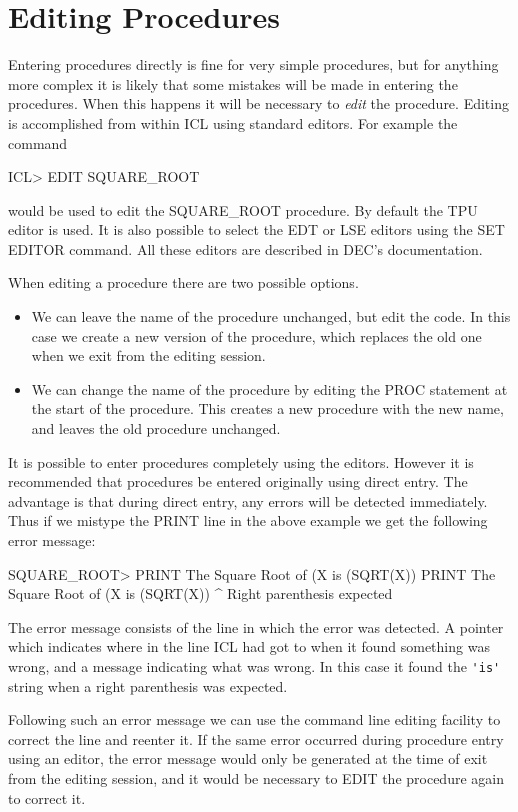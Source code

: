 \documentclass[twoside,11pt,nolof,chapters]{starlink}
\begin{document}
\section{Editing Procedures}
Entering procedures directly is fine for very simple procedures, but for
anything more complex it is likely that some mistakes will be made in
entering the procedures. When this happens it will be necessary to
\emph{edit} the procedure. Editing is accomplished from within ICL using
standard editors.
For example the command
\begin{terminalv}
    ICL> EDIT SQUARE_ROOT
\end{terminalv}
would be used to edit the SQUARE\_ROOT procedure. By default the TPU editor
is used. It is also possible to select the EDT or LSE editors using the
SET EDITOR command. All these editors are described in DEC's documentation.

When editing a procedure there are two possible options.
\begin{itemize}
\item We can leave the name of the procedure unchanged, but edit the code. In
this case we create a new version of the procedure, which replaces the old
one when we exit from the editing session.
\item We can change the name of the procedure by editing the PROC statement
at the start of the procedure. This creates a new procedure with the
new name, and leaves the old procedure unchanged.
\end{itemize}

It is possible to enter procedures completely using the editors. However
it is recommended that procedures be entered originally using direct entry.
The advantage is that during direct entry, any errors will be detected immediately.
Thus if we mistype the PRINT line in the above example we get the following
error message:
\begin{terminalv}
    SQUARE_ROOT> PRINT The Square Root of (X is (SQRT(X))
    PRINT The Square Root of (X is (SQRT(X))
                                ^
    Right parenthesis expected
\end{terminalv}
The error message consists of the line in which the error was detected. A
pointer which indicates where in the line ICL had got to when it found
something was wrong, and a message indicating what was wrong. In this case
it found the \verb+'is'+ string when a right parenthesis was expected.

Following such an error message we can use the command line editing facility
to correct the line and reenter it. If the same error occurred during
procedure entry using an editor, the error message would only be generated
at the time of exit from the editing session, and it would be necessary to
EDIT the procedure again to correct it.
\end{document}
